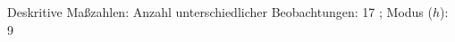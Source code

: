 				\label{tableValues:adem11b_g2d}
				\vspace*{-\baselineskip}
                    \begin{noten}
                	    \note{} Deskritive Maßzahlen:
                	    Anzahl unterschiedlicher Beobachtungen: 17%
                	    ; 
                	      Modus ($h$): 9
                     \end{noten}


